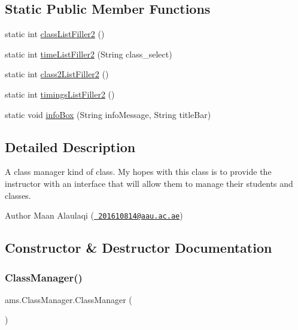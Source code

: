 \subsection*{Static Public Member Functions}
\begin{DoxyCompactItemize}
\item 
static int \mbox{\hyperlink{classams_1_1_class_manager_a9b0924e9fc08323cf6a91bea96f8f398}{class\+List\+Filler2}} ()
\item 
static int \mbox{\hyperlink{classams_1_1_class_manager_a14992ccf08396a727940200ec421d4f1}{time\+List\+Filler2}} (String class\+\_\+select)
\item 
static int \mbox{\hyperlink{classams_1_1_class_manager_a0c0987f97d77198e6781fbbc6586b76b}{class2\+List\+Filler2}} ()
\item 
static int \mbox{\hyperlink{classams_1_1_class_manager_a58654d39f62f9d5c11d8967c0fef3059}{timings\+List\+Filler2}} ()
\item 
static void \mbox{\hyperlink{classams_1_1_class_manager_a3485ea2038d2b1050bb772a27aa45b38}{info\+Box}} (String info\+Message, String title\+Bar)
\end{DoxyCompactItemize}


\subsection{Detailed Description}
A class manager kind of class. My hopes with this class is to provide the instructor with an interface that will allow them to manage their students and classes.

\begin{DoxyAuthor}{Author}
Maan Alaulaqi (\href{mailto:201610814@aau.ac.ae}{\texttt{ 201610814@aau.\+ac.\+ae}}) 
\end{DoxyAuthor}


\subsection{Constructor \& Destructor Documentation}
\mbox{\label{classams_1_1_class_manager_a3b26f0eba3ed4f3c02d2e2bf1733863f}} 
\subsubsection{\texorpdfstring{ClassManager()}{ClassManager()}}
{\footnotesize\ttfamily ams.\+Class\+Manager.\+Class\+Manager (\begin{DoxyParamCaption}{ }\end{DoxyParamCaption})}

